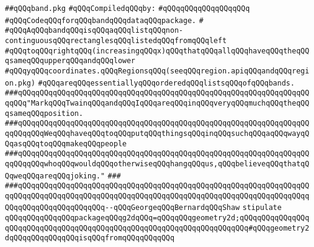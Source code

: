 \label{src/lib/x-kit/draw/band.pkg}
\verb|##qQQqband.pkg|\newline
\newline
\verb|#qQQqCompiledqQQqby:|\newline
\verb|#qQQqqQQqqQQqqQQqqQQq|\newline
\newline
\newline
\newline
\verb|#qQQqCodeqQQqforqQQqbandqQQqdataqQQqpackage.|\newline
\verb|#|\newline
\verb|#qQQqAqQQqbandqQQqisqQQqaqQQqlistqQQqnon-continguousqQQqrectanglesqQQqlistedqQQqfromqQQqleft|\newline
\verb|#qQQqtoqQQqrightqQQq(increasingqQQqx)qQQqthatqQQqallqQQqhaveqQQqtheqQQqsameqQQqupperqQQqandqQQqlower|\newline
\verb|#qQQqyqQQqcoordinates.qQQqRegionsqQQq(seeqQQqregion.apiqQQqandqQQqregion.pkg)|\newline
\verb|#qQQqareqQQqessentiallyqQQqorderedqQQqlistsqQQqofqQQqbands.|\newline
\newline
\newline
\newline
\verb|###qQQqqQQqqQQqqQQqqQQqqQQqqQQqqQQqqQQqqQQqqQQqqQQqqQQqqQQqqQQqqQQqqQQqqQQq"MarkqQQqTwainqQQqandqQQqIqQQqareqQQqinqQQqveryqQQqmuchqQQqtheqQQqsameqQQqposition.|\newline
\verb|###qQQqqQQqqQQqqQQqqQQqqQQqqQQqqQQqqQQqqQQqqQQqqQQqqQQqqQQqqQQqqQQqqQQqqQQqqQQqWeqQQqhaveqQQqtoqQQqputqQQqthingsqQQqinqQQqsuchqQQqaqQQqwayqQQqasqQQqtoqQQqmakeqQQqpeople|\newline
\verb|###qQQqqQQqqQQqqQQqqQQqqQQqqQQqqQQqqQQqqQQqqQQqqQQqqQQqqQQqqQQqqQQqqQQqqQQqqQQqwhoqQQqwouldqQQqotherwiseqQQqhangqQQqus,qQQqbelieveqQQqthatqQQqweqQQqareqQQqjoking."|\newline
\verb|###|\newline
\verb|###qQQqqQQqqQQqqQQqqQQqqQQqqQQqqQQqqQQqqQQqqQQqqQQqqQQqqQQqqQQqqQQqqQQqqQQqqQQqqQQqqQQqqQQqqQQqqQQqqQQqqQQqqQQqqQQqqQQqqQQqqQQqqQQqqQQqqQQqqQQqqQQqqQQqqQQqqQQqqQQq--qQQqGeorgeqQQqBernardqQQqShaw|\newline
\newline
\newline
\newline
\verb|stipulate|\newline
\verb|qQQqqQQqqQQqqQQqpackageqQQqg2dqQQq=qQQqqQQqgeometry2d;qQQqqQQqqQQqqQQqqQQqqQQqqQQqqQQqqQQqqQQqqQQqqQQqqQQqqQQqqQQqqQQqqQQqqQQq#qQQqgeometry2dqQQqqQQqqQQqqQQqisqQQqfromqQQqqQQqqQQq|\newline
